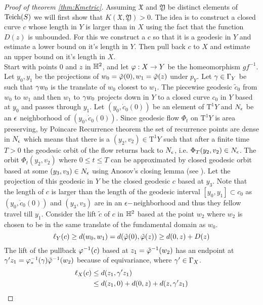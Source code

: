 \begin{proof}[Proof of theorem \ref{thm:Kmetric}]
  Assuming $ \mathfrak{X}$ and $ \mathfrak{Y}$ be distinct elements of $\text{Teich}(S)$ we will first show that $K( \mathfrak{X}, \mathfrak{Y})>0$. The idea is to construct a closed curve $c$ whose length in $Y$ is larger than in $X$ using the fact that the function $D(z)$ is unbounded. For this we construct a $c$ so that it is a geodesic in $Y$ and estimate a lower bound on it's length in $Y$. Then pull back $c$ to $X$ and estimate an upper bound on it's length in $X$.\\

  Start with points $0$ and $z$ in $\mathbb{H}^2$, and let $\varphi:X\to Y$ be the homeomorphism $gf^{-1}$. Let $y_0, y_1$ be the projections of $w_0=\tilde{\varphi}(0), w_1 = \tilde{\varphi}(z)$ under $p_Y$. Let $\gamma\in \Gamma_Y$ be such that $\gamma w_0$ is the translate of $w_0$ closest to $w_1$. The piecewise geodesic $\tilde{c}_0$ from $w_0$ to $w_1$ and then $w_1$ to $\gamma w_0$ projects down in $Y$ to a closed curve $c_0$ in $Y$ based at $y_0$ and passes through $y_1$. Let $(y_0,\dot{c}_0(0))$ be an element of $\text{T}^1Y$ and $N_\epsilon$ be an $\epsilon$ neighborhood of $(y_0, \dot{c}_0(0))$. Since geodesic flow $\Phi_t$ on $\text{T}^1Y$ is area preserving, by Poincare Recurrence theorem the set of recurrence points are dense in $N_\epsilon$ which means that there is a $(y_2, v_2)\in \text{T}^1Y$ such that after a finite time $T>0$ the geodesic orbit of the flow returns back to $N_\epsilon$, i.e. $\Phi_T(y_2, v_2)\in N_\epsilon$. The orbit $\Phi_t(y_2,v_2)$ where $0\leq t\leq T$ can be approximated by closed geodesic orbit based at some $(y_3,v_3)\in N_\epsilon$ using Anosov's closing lemma (see \cite{dynamics}). Let the projection of this geodesic in $Y$ be the closed geodesic $c$ based at $y_3$. Note that the length of $c$ is larger than the length of the geodesic interval $[y_0,y_1]\subset c_0$ as $(y_0, \dot{c}_0(0))$ and $(y_3,v_3)$ are in an $\epsilon-$neighborhood and thus they fellow travel till $y_1$. Consider the lift $\tilde{c}$ of $c$ in $\mathbb{H}^2$ based at the point $w_2$ where $w_2$ is chosen to be in the same translate of the fundamental domain as $w_0$. 
  $$\ell_Y(c) \geq d(w_0, w_1) = d(\tilde{\varphi}(0), \tilde{\varphi}(z)) \geq d(0,z) + D(z)$$
  The lift of the pullback $\varphi^{-1}(c)$ based at $z_1 = \tilde{\varphi}^{-1}(w_2)$ has an endpoint at $\gamma'z_1 = \varphi_*^{-1}(\gamma) \tilde{\varphi}^{-1}(w_2)$ because of equivariance, where $\gamma'\in \Gamma_X$. 
  \begin{align*}
    \ell_X(c) &\leq d(z_1, \g'z_1)\\
           &\leq  d(z_1,0)+ d(0,z) +  d(z,\g'z_1)\\

\end{align*}
\end{proof}
